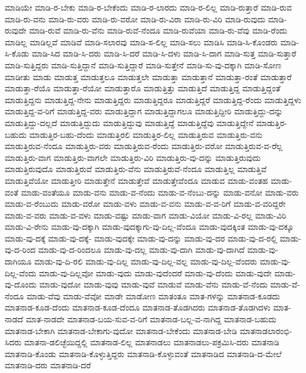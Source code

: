 {ಮಾಡಿಯೇ
ಮಾಡಿ-ರ-ಬೇಕು
ಮಾಡಿ-ರ-ಬೇಕೆಂದು
ಮಾಡಿ-ರ-ಲಾರದು
ಮಾಡಿ-ರ-ಲಿಲ್ಲ
ಮಾಡಿ-ರುತ್ತಾರೆ
ಮಾಡಿ-ರುವ
ಮಾಡಿ-ರು-ವನು
ಮಾಡಿ-ರು-ವರು
ಮಾಡಿ-ರು-ವರೋ
ಮಾಡಿ-ರು-ವಿರಾ
ಮಾಡಿ-ರು-ವಿರಿ
ಮಾಡಿ-ರುವುದು
ಮಾಡಿ-ರುವುದೇ
ಮಾಡಿ-ರುವೆ
ಮಾಡಿ-ರು-ವೆನು
ಮಾಡಿ-ರುವೆ-ನೆಂದೂ
ಮಾಡಿ-ರುವೆಯಾ
ಮಾಡಿ-ರು-ವೆವು
ಮಾಡಿ-ರೆಂದು
ಮಾಡಿಲ್ಲ
ಮಾಡಿಲ್ಲವೆ
ಮಾಡಿವೆ
ಮಾಡಿ-ಸಲಾರವು
ಮಾಡಿ-ಸ-ಲಿಲ್ಲ
ಮಾಡಿ-ಸಲು
ಮಾಡಿಸಿ
ಮಾಡಿ-ಸಿ-ಕೊಂಡರು
ಮಾಡಿ-ಸಿ-ಕೊಡು
ಮಾಡಿ-ಸಿದ
ಮಾಡಿ-ಸಿ-ದರು
ಮಾಡಿ-ಸಿ-ದರೆ
ಮಾಡಿ-ಸಿ-ದಳು
ಮಾಡಿ-ಸಿ-ದಾಗ
ಮಾಡಿ-ಸುತ್ತ
ಮಾಡಿ-ಸುತ್ತಾರೆ
ಮಾಡಿ-ಸುತ್ತಿದ್ದರು
ಮಾಡಿ-ಸುತ್ತಿದ್ದಾನೆ
ಮಾಡಿ-ಸುತ್ತಿದ್ದಾರೆ
ಮಾಡಿ-ಸುತ್ತೇನೆ
ಮಾಡಿ-ಸು-ವು-ದಕ್ಕಾಗಿ
ಮಾಡಿ-ಸೋಣ
ಮಾಡೀತು
ಮಾಡು
ಮಾಡುತ್ತ
ಮಾಡುತ್ತಲೂ
ಮಾಡುತ್ತಲೇ
ಮಾಡುತ್ತಾ
ಮಾಡುತ್ತಾನೆ
ಮಾಡುತ್ತಾ-ರಂತೆ
ಮಾಡುತ್ತಾರೆ
ಮಾಡುತ್ತಾ-ರೆಯೊ
ಮಾಡುತ್ತಾ-ರೆಯೋ
ಮಾಡುತ್ತಾರೊ
ಮಾಡುತ್ತಿತ್ತು
ಮಾಡುತ್ತಿದೆ
ಮಾಡುತ್ತಿದ್ದ
ಮಾಡುತ್ತಿದ್ದಂತೆ
ಮಾಡುತ್ತಿದ್ದನು
ಮಾಡುತ್ತಿದ್ದ-ನೇನು
ಮಾಡುತ್ತಿದ್ದರು
ಮಾಡುತ್ತಿದ್ದರೂ
ಮಾಡುತ್ತಿದ್ದರೆ
ಮಾಡುತ್ತಿದ್ದ-ರೆಂದು
ಮಾಡುತ್ತಿದ್ದಳು
ಮಾಡುತ್ತಿದ್ದ-ವ-ರಿಗೆ
ಮಾಡುತ್ತಿದ್ದ-ವರು
ಮಾಡುತ್ತಿದ್ದಾಗ
ಮಾಡುತ್ತಿದ್ದಾಗಲೂ
ಮಾಡುತ್ತಿದ್ದೀರಿ
ಮಾಡುತ್ತಿದ್ದು-ದನ್ನು
ಮಾಡುತ್ತಿದ್ದು-ದಲ್ಲದೆ
ಮಾಡುತ್ತಿದ್ದುದು
ಮಾಡುತ್ತಿದ್ದುವು
ಮಾಡುತ್ತಿದ್ದೆ
ಮಾಡುತ್ತಿದ್ದೆವು
ಮಾಡುತ್ತಿದ್ದೇನೆ
ಮಾಡುತ್ತಿರ-ಬಹುದು
ಮಾಡುತ್ತಿರ-ಬಹು-ದೆಂದು
ಮಾಡುತ್ತಿರಲಿ
ಮಾಡುತ್ತಿರ-ಲಿಲ್ಲ
ಮಾಡುತ್ತಿರುವ
ಮಾಡುತ್ತಿರು-ವನು
ಮಾಡುತ್ತಿರುವ-ನೆಂದೂ
ಮಾಡುತ್ತಿರು-ವರು
ಮಾಡುತ್ತಿರುವ-ರೆಂದು
ಮಾಡುತ್ತಿರು-ವರೋ
ಮಾಡುತ್ತಿರುವ-ವ-ರೆಲ್ಲ
ಮಾಡುತ್ತಿರು-ವಾಗ
ಮಾಡುತ್ತಿರು-ವಾಗಲೇ
ಮಾಡುತ್ತಿರು-ವಿರಿ
ಮಾಡುತ್ತಿರು-ವು-ದನ್ನು
ಮಾಡುತ್ತಿರುವುದು
ಮಾಡುತ್ತಿರುವುದೊ
ಮಾಡುತ್ತಿರುವೆ
ಮಾಡುತ್ತಿರು-ವೆನು
ಮಾಡುತ್ತಿರುವೆ-ನೆಂದೂ
ಮಾಡುತ್ತಿಲ್ಲ
ಮಾಡುತ್ತಿವೆ
ಮಾಡುತ್ತಿವೆಯೋ
ಮಾಡುತ್ತೀರಿ
ಮಾಡುತ್ತೇನೆ
ಮಾಡುತ್ತೇವೆ
ಮಾಡುತ್ತೇವೆಂದೂ
ಮಾಡುವ
ಮಾಡು-ವಂತಹ
ಮಾಡು-ವಂತೆ
ಮಾಡು-ವಂತೆಯೂ
ಮಾಡು-ವನು
ಮಾಡು-ವ-ನೆಂದು
ಮಾಡು-ವ-ನೆಂಬು-ದನ್ನು
ಮಾಡು-ವನೋ
ಮಾಡು-ವರು
ಮಾಡು-ವ-ರೆಂಬುದು
ಮಾಡು-ವರೋ
ಮಾಡು-ವಳು
ಮಾಡು-ವ-ವನು
ಮಾಡು-ವ-ವ-ರಿಗೆ
ಮಾಡು-ವ-ವರಿದ್ದರೇ
ಮಾಡು-ವ-ವರು
ಮಾಡು-ವ-ವಳು
ಮಾಡು-ವಷ್ಟು
ಮಾಡು-ವಾಗ
ಮಾಡು-ವಿಯೋ
ಮಾಡು-ವಿ-ರಲ್ಲ
ಮಾಡು-ವಿರಿ
ಮಾಡು-ವಿ-ರೇನು
ಮಾಡು-ವು-ದಕ್ಕಾಗಿ
ಮಾಡು-ವುದಕ್ಕಾಗು-ವು-ದಿಲ್ಲ-ವೆಂದೂ
ಮಾಡು-ವುದಕ್ಕಿಂತ
ಮಾಡು-ವು-ದಕ್ಕೂ
ಮಾಡು-ವು-ದಕ್ಕೆ
ಮಾಡು-ವು-ದಕ್ಕೆ-
ಮಾಡು-ವುದಕ್ಕೇ
ಮಾಡು-ವು-ದನ್ನು
ಮಾಡು-ವು-ದರ
ಮಾಡು-ವು-ದ-ರಲ್ಲಿ
ಮಾಡು-ವು-ದ-ರಿಂದ
ಮಾಡು-ವು-ದ-ರಿಂದಲೂ
ಮಾಡು-ವು-ದಲ್ಲ
ಮಾಡು-ವು-ದಾಗಿ
ಮಾಡು-ವು-ದಾಗಿದೆ
ಮಾಡು-ವು-ದಾಗಿಯೂ
ಮಾಡು-ವು-ದಿ-ರಲಿ
ಮಾಡು-ವು-ದಿಲ್ಲ
ಮಾಡು-ವು-ದಿಲ್ಲ-ವಲ್ಲ
ಮಾಡು-ವು-ದಿಲ್ಲ-ವೆಂದರು
ಮಾಡು-ವು-ದಿಲ್ಲ-ವೆಂದು
ಮಾಡು-ವು-ದಿಲ್ಲವೋ
ಮಾಡು-ವುದು
ಮಾಡು-ವುದೆಂದರೆ
ಮಾಡು-ವು-ದೆಂದು
ಮಾಡು-ವುದೇ
ಮಾಡು-ವು-ದೊಂದು
ಮಾಡು-ವುದೋ
ಮಾಡು-ವುವು
ಮಾಡು-ವುವೆ
ಮಾಡುವೆ
ಮಾಡು-ವೆನು
ಮಾಡು-ವೆ-ನೆಂದು
ಮಾಡು-ವೆ-ನೆಂದೂ
ಮಾಡು-ವೆವು
ಮಾಡು-ವೆವೋ
ಮಾಡೇ
ಮಾಡೋಣ
ಮಾತಂತೂ
ಮಾತ-ಗಳನ್ನು
ಮಾತನಾಡ-ಕೂಡದು
ಮಾತನಾಡ-ಕೂಡ-ದೆಂದು
ಮಾತನಾಡ-ಕೂಡ-ದೆಂದೂ
ಮಾತನಾಡ-ತೊಡಗಿದರು
ಮಾತನಾಡ-ತೊಡಗಿದಳು
ಮಾತ-ನಾಡದೆ
ಮಾತ-ನಾಡದೇ
ಮಾತನಾಡ-ಬಯ-ಸುವ-ವ-ರಿಗೆ
ಮಾತನಾಡ-ಬಲ್ಲ-ವ-ನಾಗಿದ್ದ
ಮಾತನಾಡ-ಬಹುದು
ಮಾತನಾಡ-ಬೇಕಾಗಿ
ಮಾತನಾಡ-ಬೇಕಾಗು-ವುದೋ
ಮಾತನಾಡ-ಬೇಕೆಂದು
ಮಾತನಾಡ-ಬೇಡಿ
ಮಾತನಾಡಲಾರಂಭಿ-ಸಿದರು
ಮಾತನಾ-ಡಲಿಚ್ಛೆಯಿದ್ದಲ್ಲಿ
ಮಾತನಾಡ-ಲಿಲ್ಲ
ಮಾತನಾಡಲು
ಮಾತನಾಡಲು-ಪಕ್ರಮಿಸಿ-ದರು
ಮಾತನಾಡಿ
ಮಾತನಾಡಿ-ಕೊಂಡು
ಮಾತನಾಡಿ-ಕೊಳ್ಳುತ್ತಿದ್ದರು
ಮಾತನಾಡಿ-ಕೊಳ್ಳುವಂತೆ
ಮಾತನಾಡಿದ
ಮಾತನಾಡಿ-ದ-ಮೇಲೆ
ಮಾತನಾಡಿ-ದರು
ಮಾತನಾಡಿ-ದರೆ
}

